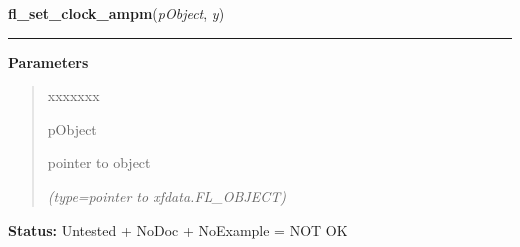 \hspace{.8\funcindent}\begin{boxedminipage}{\funcwidth}

    \raggedright \textbf{fl\_set\_clock\_ampm}(\textit{pObject}, \textit{y})

    \vspace{-1.5ex}

    \rule{\textwidth}{0.5\fboxrule}
\setlength{\parskip}{2ex}
\setlength{\parskip}{1ex}
      \textbf{Parameters}
      \vspace{-1ex}

      \begin{quote}
        \begin{Ventry}{xxxxxxx}

          \item[pObject]

          pointer to object

            {\it (type=pointer to xfdata.FL\_OBJECT)}

        \end{Ventry}

      \end{quote}

\textbf{Status:} Untested + NoDoc + NoExample = NOT OK



    \end{boxedminipage}

    \label{xformslib:library:fl_add_counter}

    \vspace{0.5ex}

